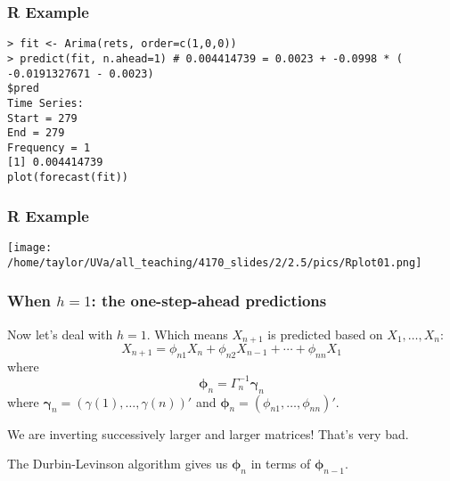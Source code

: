 \documentclass{beamer}
\begin{document}


\begin{frame}[fragile]
\frametitle{R Example}

\begin{verbatim}
> fit <- Arima(rets, order=c(1,0,0))
> predict(fit, n.ahead=1) # 0.004414739 = 0.0023 + -0.0998 * ( -0.0191327671 - 0.0023)
$pred
Time Series:
Start = 279 
End = 279 
Frequency = 1 
[1] 0.004414739
plot(forecast(fit))
\end{verbatim}


\end{frame}



\begin{frame}[fragile]
\frametitle{R Example}



\texttt{[image: /home/taylor/UVa/all\_teaching/4170\_slides/2/2.5/pics/Rplot01.png]}

\end{frame}



\begin{frame}
\frametitle{When $h=1$: the one-step-ahead predictions}


Now let's deal with $h=1$. Which means $X_{n+1}$ is predicted based on $X_1,\ldots,X_n$:
\[
X_{n+1} = \phi_{n1}X_n + \phi_{n2}X_{n-1} + \cdots + \phi_{nn} X_1 
\]
where
\[
\bm{\phi}_n = \Gamma_n^{-1}\bm{\gamma}_n
\]
where $\bm{\gamma}_n = (\gamma(1), \ldots, \gamma(n))'$ and $\bm{\phi}_n = (\phi_{n1},\ldots,\phi_{nn})'$.
\newline

We are inverting successively larger and larger matrices! That's very bad.
\newline

The Durbin-Levinson algorithm gives us $\bm{\phi}_{n}$ in terms of $\bm{\phi}_{n-1}$.
\end{frame}

\end{document}
